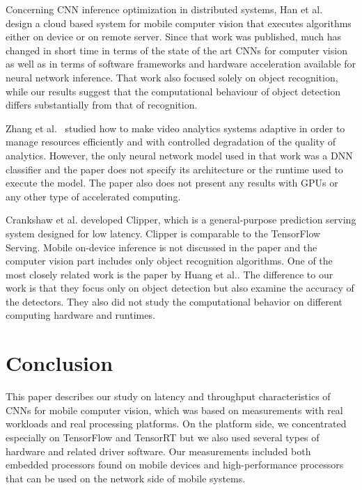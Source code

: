 \documentclass[sigconf]{acmart}
\begin{document}
Concerning CNN inference optimization in distributed systems, Han et al.~\cite{han16mobisys} design a cloud based system for mobile computer vision that executes algorithms either on device or on remote server. Since that work was published, much has changed in short time in terms of the state of the art CNNs for computer vision as well as in terms of software frameworks and hardware acceleration available for neural network inference. That work also focused solely on object recognition, while our results suggest that the computational behaviour of object detection differs substantially from that of recognition.

Zhang et al.~\cite{zhang17nsdi} studied how to make video analytics systems adaptive in order to manage resources efficiently and with controlled degradation of the quality of analytics. However, the only neural network model used in that work was a DNN classifier and the paper does not specify its architecture or the runtime used to execute the model. The paper also does not present any results with GPUs or any other type of accelerated computing.

Crankshaw et al.\cite{crankshaw17nsdi} developed Clipper, which is a general-purpose prediction serving system designed for low latency. Clipper is comparable to the TensorFlow Serving.
Mobile on-device inference is not discussed in the paper and the computer vision part includes only object recognition algorithms. One of the most closely related work is the paper by Huang et al.\cite{Huang2017CVPR}. The difference to our work is that they focus only on object detection but also examine the accuracy of the detectors. They also did not study the computational behavior on different computing hardware and runtimes.



\section{Conclusion}
\label{sec:conclusion}

This paper describes our study on latency and throughput characteristics of CNNs for mobile computer vision, which was based on measurements with real workloads and real processing platforms. On the platform side, we concentrated especially on TensorFlow and TensorRT but we also used several types of hardware and related driver software. Our measurements included both embedded processors found on mobile devices and high-performance processors that can be used on the network side of mobile systems.
\end{document}
